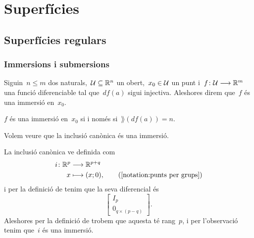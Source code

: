 \documentclass[../../main.tex]{subfiles}
\begin{document}
\chapter{Superfícies}
\section{Superfícies regulars}
    \subsection{Immersions i submersions}
    \begin{definition}[Immersió]
        \label{def:immersió}
        Siguin~\(n\leq m\) dos naturals,~\(\mathcal{U}\subseteq\mathbb{R}^{n}\) un obert,~\(x_{0}\in\mathcal{U}\) un punt i~\(f\colon\mathcal{U}\longrightarrow\mathbb{R}^{m}\) una funció diferenciable tal que~\(df(a)\) sigui injectiva.
        Aleshores direm que~\(f\) és una immersió en~\(x_{0}\).
    \end{definition}
    \begin{observation} %
        \label{obs:immersió si i només si té rang maximal}
        \(f\) és una immersió en~\(x_{0}\) si i només si~\(\rang(df(a))=n\).
    \end{observation}
    \begin{example}
        \label{ex:la inclusió canònica és una immersió}
        Volem veure que la inclusió canònica és una immersió.
        \begin{solution}
            La inclusió canònica ve definida com
            \begin{align*}
                i\colon\mathbb{R}^{p}&\longrightarrow\mathbb{R}^{p+q} \\
                x&\longmapsto(x;0), \tag{\ref{notation:punts per grups}}
            \end{align*}
            i per la definició de  tenim que la seva diferencial és
            \[\left[\begin{array}{c}
                I_{p} \\\hline
                0_{q\times(p-q)}
            \end{array}\right].\]
            Aleshores per la definició de  trobem que aquesta té rang~\(p\), i per l'observació  tenim que~\(i\) és una immersió.
        \end{solution}
    \end{example}
\end{document}
